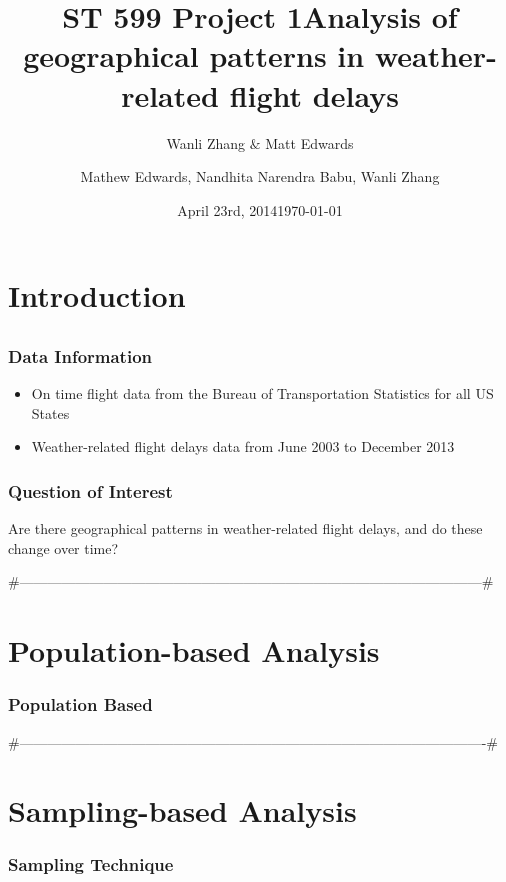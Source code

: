 \documentclass[serif,mathserif]{beamer}
\title %
{ST 599 Project 1}
\author[] %
{Wanli Zhang $\&$ Matt Edwards}
\institute[] %
{Oregon State University}
\date{April 23rd, 2014} %
\title{Analysis of geographical patterns in weather-related flight delays}
\author{Mathew Edwards, Nandhita Narendra Babu, Wanli Zhang}
\date{\today}
\begin{document}
\begin{frame}
\titlepage
\end{frame}

\begin{frame}{\contentsname}
\tableofcontents
\end{frame}

\section{Introduction}
\subsection{}

\begin{frame}
\frametitle{Data Information}
\begin{itemize}
\item On time flight data from the Bureau of Transportation Statistics for all US States
\item Weather-related flight delays data from June 2003 to December 2013
\end{itemize}
\end{frame}

\begin{frame}
\frametitle{Question of Interest}
Are there geographical patterns in weather-related flight delays, and do these change over time?
\end{frame}




#---------------------------------------------------------------------------------------------------#




\section{Population-based Analysis}
\begin{frame}
\frametitle{Population Based}
\begin{center} 

\end{center}
\end{frame}




#----------------------------------------------------------------------------------------------------#





\section{Sampling-based Analysis}
\begin{frame}
\frametitle{Sampling Technique}
\begin{center} 
\end{center}
\end{frame}
\end{document}
